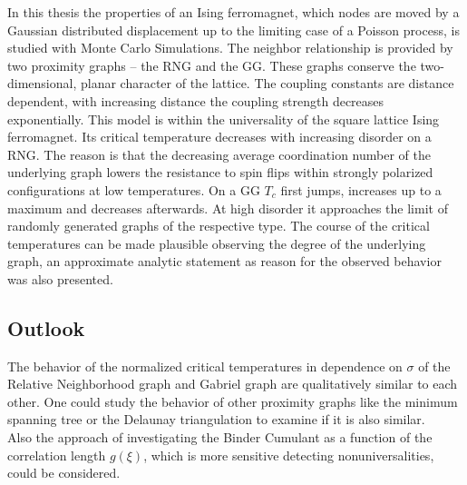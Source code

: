 In this thesis the properties of an Ising ferromagnet, which nodes are
moved by a Gaussian distributed displacement up to the limiting case of
a Poisson process, is studied with Monte Carlo
Simulations. The neighbor relationship is provided by two proximity graphs
-- the RNG and the GG. These graphs conserve the two-dimensional, planar
character of the lattice. The coupling constants
are distance dependent, with increasing distance the coupling strength
decreases exponentially.
This model is within the universality of the square lattice Ising
ferromagnet. Its critical temperature decreases with increasing disorder
on a RNG. The reason is that the decreasing average coordination number
of the underlying graph lowers the resistance to spin flips within
strongly polarized configurations at low temperatures.
On a GG \(T_c\) first jumps, increases up to a maximum and decreases
afterwards. At high disorder it approaches the limit of randomly generated
graphs of the respective type. The course of the critical temperatures
can be made plausible observing the degree of the underlying graph, an
approximate analytic statement as reason for the observed behavior was
also presented.

\subsection{Outlook}
    The behavior of the normalized critical temperatures in dependence
    on \(\sigma\) of the Relative Neighborhood graph and Gabriel graph
    are qualitatively similar to each other. One could study the behavior
    of other proximity graphs like the minimum spanning tree or the
    Delaunay triangulation to examine if it is also similar.\\
    Also the approach of investigating the Binder Cumulant as a function
    of the correlation length \(g(\xi)\), which is more
    sensitive detecting nonuniversalities\cite{Hartmann2013}, could be considered.
